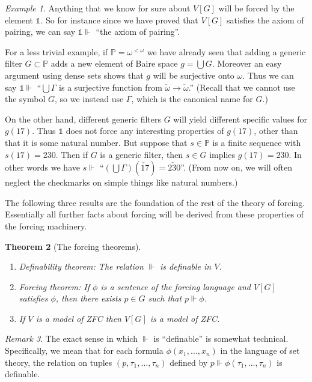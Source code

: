 \documentclass[11pt,oneside,a4paper]{amsbook}
\newcommand{\forces}{\Vdash}
\theoremstyle{definition}
\theoremstyle{plain}
\newtheorem{theorem}{Theorem}[section]
\theoremstyle{definition}
\theoremstyle{remark}
\newtheorem{remark}[theorem]{Remark}
\newtheorem{example}[theorem]{Example}
\numberwithin{equation}{section}
\numberwithin{figure}{section}
\begin{document}
\begin{example}
  Anything that we know for sure about $V[G]$ will be forced by the element $\mathbb 1$. So for instance since we have proved that $V[G]$ satisfies the axiom of pairing, we can say $\mathbb 1\forces$ ``the axiom of pairing''.

  For a less trivial example, if $\mathbb P=\omega^{<\omega}$ we have already seen that adding a generic filter $G\subset\mathbb P$ adds a new element of Baire space $g=\bigcup G$. Moreover an easy argument using dense sets shows that $g$ will be surjective onto $\omega$. Thus we can say $\mathbb 1\forces$ ``$\bigcup\Gamma$ is a surjective function from $\check\omega\to\check\omega$.'' (Recall that we cannot use the symbol $G$, so we instead use $\Gamma$, which is the canonical name for $G$.)

  On the other hand, different generic filters $G$ will yield different specific values for $g(17)$. Thus $\mathbb 1$ does not force any interesting properties of $g(17)$, other than that it is some natural number. But suppose that $s\in\mathbb P$ is a finite sequence with $s(17)=230$. Then if $G$ is a generic filter, then $s\in G$ implies $g(17)=230$. In other words we have $s\forces$ ``$(\bigcup\Gamma)(\check{17})=\check{230}$''. (From now on, we will often neglect the checkmarks on simple things like natural numbers.)
\end{example}

The following three results are the foundation of the rest of the theory of forcing. Essentially all further facts about forcing will be derived from these properties of the forcing machinery.

\begin{theorem}[The forcing theorems]\
  \label{thm:forcing}
  \begin{enumerate}
    \item \textup{Definability theorem}: The relation $\forces$ is definable in $V$.
    \item \textup{Forcing theorem}: If $\phi$ is a sentence of the forcing language and $V[G]$ satisfies $\phi$, then there exists $p\in G$ such that $p\forces\phi$.
    \item If $V$ is a model of ZFC then $V[G]$ is a model of ZFC.
  \end{enumerate}
\end{theorem}

\begin{remark}
  The exact sense in which $\forces$ is ``definable'' is somewhat technical. Specifically, we mean that for each formula $\phi(x_1,\ldots,x_n)$ in the language of set theory, the relation on tuples $(p,\tau_1,\ldots,\tau_n)$ defined by $p\forces\phi(\tau_1,\ldots,\tau_n)$ is definable.
\end{remark}
\end{document}
